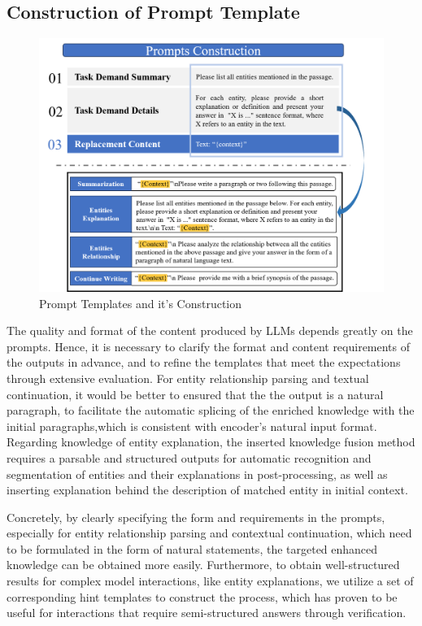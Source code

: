 \documentclass[a4paper,fleqn,twocolumn]{cas-dc}
\newcommand{\1}[1]{\mathds{1}\left[#1\right]}
\begin{document}
\subsection{Construction of Prompt Template}
	\label{sec:prompt_construction}
	\begin{figure}[h]
		\centering
		\includegraphics[width=14.5cm]{Prompts_construction.png}
		\caption{Prompt Templates and it's Construction}
		\label{fig:prompt_template}
	\end{figure}   
	
	The quality and format of the content produced by LLMs depends greatly on the prompts. Hence, it is necessary to clarify the format and content requirements of the outputs in advance, and to refine the templates that meet the expectations through extensive evaluation.
	For entity relationship parsing and textual continuation, it would be better to ensured that the the output is a natural paragraph, to facilitate the automatic splicing of the enriched knowledge with the initial paragraphs,which is consistent with encoder's natural input format.
	Regarding knowledge of entity explanation, the inserted knowledge fusion method requires a parsable and structured outputs for automatic recognition and segmentation of entities and their explanations in post-processing, as well as inserting explanation behind the description of matched entity in initial context.
	
	Concretely, by clearly specifying the form and requirements in the prompts, especially for entity relationship parsing and contextual continuation, which need to be formulated in the form of natural statements, the targeted enhanced knowledge can be obtained more easily.
	Furthermore, to obtain well-structured results for complex model interactions, like entity explanations, we utilize a set of corresponding hint templates to construct the process, which has proven to be useful for interactions that require semi-structured answers through verification. 
	
\end{document}
